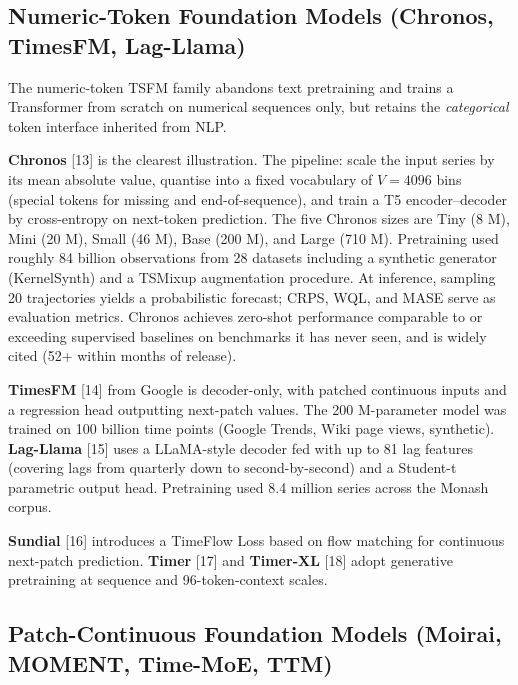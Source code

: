 \documentclass{article}
\begin{document}
\subsection{Numeric-Token Foundation Models (Chronos, TimesFM, Lag-Llama)}\label{numeric-token-foundation-models-chronos-timesfm-lag-llama}

The numeric-token TSFM family abandons text pretraining and trains a Transformer from scratch on numerical sequences only, but retains the \emph{categorical} token interface inherited from NLP.

\textbf{Chronos} \citep{ansari20242024} {[}13{]} is the clearest illustration. The pipeline: scale the input series by its mean absolute value, quantise into a fixed vocabulary of \(V=4096\) bins (special tokens for missing and end-of-sequence), and train a T5 encoder--decoder by cross-entropy on next-token prediction. The five Chronos sizes are Tiny (8 M), Mini (20 M), Small (46 M), Base (200 M), and Large (710 M). Pretraining used roughly 84 billion observations from 28 datasets including a synthetic generator (KernelSynth) and a TSMixup augmentation procedure. At inference, sampling 20 trajectories yields a probabilistic forecast; CRPS, WQL, and MASE serve as evaluation metrics. Chronos achieves zero-shot performance comparable to or exceeding supervised baselines on benchmarks it has never seen, and is widely cited (52+ within months of release).

\textbf{TimesFM} \citep{das2023longtermforecastin} {[}14{]} from Google is decoder-only, with patched continuous inputs and a regression head outputting next-patch values. The 200 M-parameter model was trained on 100 billion time points (Google Trends, Wiki page views, synthetic). \textbf{Lag-Llama} \citep{rasul20232023} {[}15{]} uses a LLaMA-style decoder fed with up to 81 lag features (covering lags from quarterly down to second-by-second) and a Student-t parametric output head. Pretraining used 8.4 million series across the Monash corpus.

\textbf{Sundial} \citep{liu2025calfaligningllmsfo} {[}16{]} introduces a TimeFlow Loss based on flow matching for continuous next-patch prediction. \textbf{Timer} \citep{liu2024itransformerinvert} {[}17{]} and \textbf{Timer-XL} {[}18{]} adopt generative pretraining at sequence and 96-token-context scales.

\subsection{Patch-Continuous Foundation Models (Moirai, MOMENT, Time-MoE, TTM)}\label{patch-continuous-foundation-models-moirai-moment-time-moe-ttm}
\end{document}

